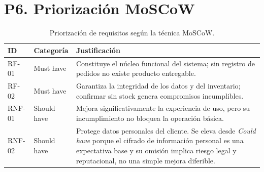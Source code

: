 \documentclass[12pt,letterpaper]{article}
\begin{document}
\begin{table}[H]
\centering
\caption{Esquema de atributos de los requisitos especificados.}
\label{tab:atributos}
\end{table}

\section*{P6. Priorización MoSCoW}

\begin{table}[H]
\centering
\caption{Priorización de requisitos según la técnica MoSCoW.}
\label{tab:moscow}
\begin{tabular}{|l|l|p{8.4cm}|}
\hline
\textbf{ID} & \textbf{Categoría} & \textbf{Justificación} \\
\hline
RF-01  & Must have   & Constituye el núcleo funcional del sistema; sin registro
                       de pedidos no existe producto entregable. \\
\hline
RF-02  & Must have   & Garantiza la integridad de los datos y del inventario;
                       confirmar sin stock genera compromisos incumplibles. \\
\hline
RNF-01 & Should have & Mejora significativamente la experiencia de uso, pero su
                       incumplimiento no bloquea la operación básica. \\
\hline
RNF-02 & Should have & Protege datos personales del cliente. Se eleva desde
                       \textit{Could have} porque el cifrado de información
                       personal es una expectativa base y su omisión implica
                       riesgo legal y reputacional, no una simple mejora
                       diferible. \\
\hline
\end{tabular}
\end{table}
\end{document}
